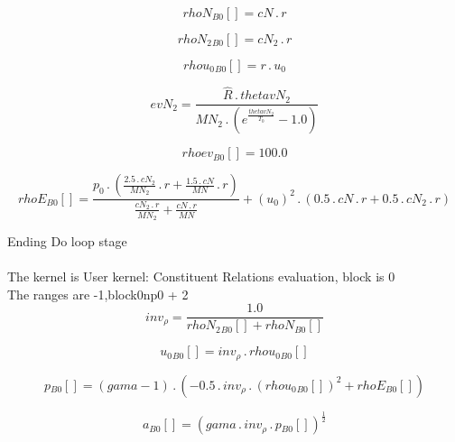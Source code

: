 \documentclass{article}
\begin{document}
\begin{dmath}{rhoN{_{B0}}}[{}] = cN \,.\, r\end{dmath}

\begin{dmath}{rhoN_{2}{_{B0}}}[{}] = cN_{2} \,.\, r\end{dmath}

\begin{dmath}{rhou_{0}{_{B0}}}[{}] = r \,.\, u_{0}\end{dmath}

\begin{dmath}evN_{2} = \frac{\hat{R} \,.\, thetavN_{2}}{MN_{2} \,.\, \left(e^{\frac{thetavN_{2}}{T_{0}}} - 1.0\right)}\end{dmath}

\begin{dmath}{rhoev{_{B0}}}[{}] = 100.0\end{dmath}

\begin{dmath}{rhoE{_{B0}}}[{}] = \frac{p_{0} \,.\, \left(\frac{2.5 \,.\, cN_{2}}{MN_{2}} \,.\, r + \frac{1.5 \,.\, cN}{MN} \,.\, r\right)}{\frac{cN_{2} \,.\, r}{MN_{2}} + \frac{cN \,.\, r}{MN}} + \left(u_{0} \right)^{2} \,.\, \left(0.5 \,.\, cN \,.\, 
r + 0.5 \,.\, cN_{2} \,.\, r\right)\end{dmath}

\noindent Ending Do loop stage\\
\\\noindent The kernel is User kernel: Constituent Relations evaluation, block is 0\\\noindent The ranges are -1,block0np0 + 2\\\begin{dmath}inv_{\rho} = \frac{1.0}{{rhoN_{2}{_{B0}}}[{}] + {rhoN{_{B0}}}[{}]}\end{dmath}

\begin{dmath}{u_{0}{_{B0}}}[{}] = inv_{\rho} \,.\, {rhou_{0}{_{B0}}}[{}]\end{dmath}

\begin{dmath}{p{_{B0}}}[{}] = \left(gama - 1\right) \,.\, \left(- 0.5 \,.\, inv_{\rho} \,.\, \left({rhou_{0}{_{B0}}}[{}] \right)^{2} + {rhoE{_{B0}}}[{}]\right)\end{dmath}

\begin{dmath}{a{_{B0}}}[{}] = \left(gama \,.\, inv_{\rho} \,.\, {p{_{B0}}}[{}] \right)^{\frac{1}{2}}\end{dmath}
\end{document}
